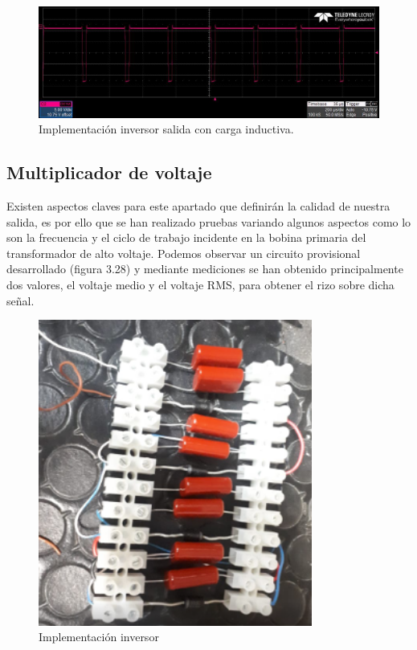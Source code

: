 \begin{figure}[H]
\centering
\includegraphics[width=12cm]{Capitulo3/figs/pwm1.jpg}
\caption{Implementación inversor salida con carga inductiva.}
\end{figure}



\subsection{Multiplicador de voltaje}

Existen aspectos claves para este apartado que definirán la calidad de nuestra salida, es por ello que se han realizado pruebas variando algunos aspectos como lo son la frecuencia y el ciclo de trabajo incidente en la bobina primaria del transformador de alto voltaje. Podemos observar un circuito provisional desarrollado (figura 3.28) y mediante mediciones se han obtenido principalmente dos valores, el voltaje medio y el voltaje RMS, para obtener el rizo sobre dicha señal.

\begin{figure}[H]
\centering
\includegraphics[width=9cm]{Capitulo3/figs/fotomulti.png}
\caption{Implementación inversor}
\end{figure}

